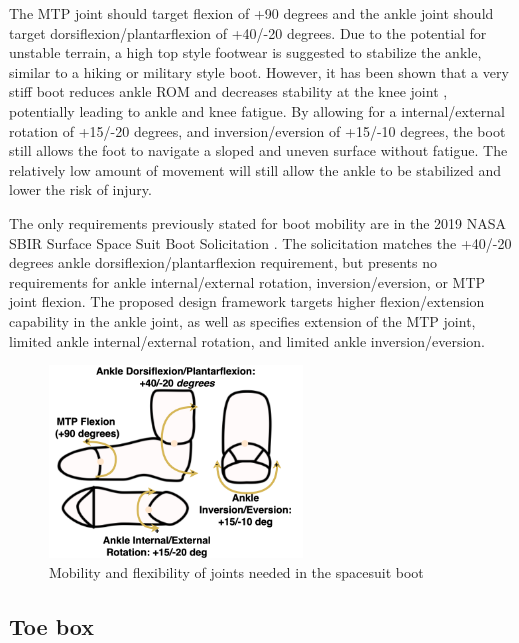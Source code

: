 \documentclass[defaultstyle,11pt]{comps}
\begin{document}
The MTP joint should target flexion of +90 degrees and the ankle joint should target dorsiflexion/plantarflexion of +40/-20 degrees.
Due to the potential for unstable terrain, a high top style footwear is suggested to stabilize the ankle, similar to a hiking or military style boot.
However, it has been shown that a very stiff boot reduces ankle ROM and decreases stability at the knee joint \citep{Bohm2010}, potentially leading to ankle and knee fatigue.
By allowing for a internal/external rotation of +15/-20 degrees, and inversion/eversion of +15/-10 degrees, the boot still allows the foot to navigate a sloped and uneven surface without fatigue.
The relatively low amount of movement will still allow the ankle to be stabilized and lower the risk of injury.

The only requirements previously stated for boot mobility are in the 2019 NASA SBIR Surface Space Suit Boot Solicitation \citep{NASA2019}.
The solicitation matches the +40/-20 degrees ankle dorsiflexion/plantarflexion requirement, but presents no requirements for ankle internal/external rotation, inversion/eversion, or MTP joint flexion.
The proposed design framework targets higher flexion/extension capability in the ankle joint, as well as specifies extension of the MTP joint, limited ankle internal/external rotation, and limited ankle inversion/eversion.

\begin{figure}
\hypertarget{fig:SA3-Mobility}{%
\centering
\includegraphics[width=0.6\textwidth,height=\textheight]{../fig/SA3/Mobility.png}
\caption{Mobility and flexibility of joints needed in the spacesuit boot}\label{fig:SA3-Mobility}
}
\end{figure}

\hypertarget{toe-box}{%
\subsection{Toe box}\label{toe-box}}
\end{document}
